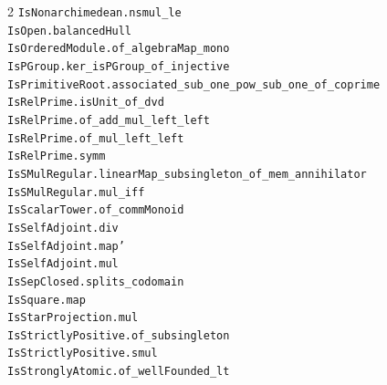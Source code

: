 \documentclass[10pt,a4paper]{article}
\begin{document}
\begin{multicols}{2}
\texttt{IsNonarchimedean.\allowbreak{}nsmul\_le} \\
\texttt{IsOpen.\allowbreak{}balancedHull} \\
\texttt{IsOrderedModule.\allowbreak{}of\_algebraMap\_mono} \\
\texttt{IsPGroup.\allowbreak{}ker\_isPGroup\_of\_injective} \\
\texttt{IsPrimitiveRoot.\allowbreak{}associated\_sub\_one\_pow\_sub\_one\_of\_coprime} \\
\texttt{IsRelPrime.\allowbreak{}isUnit\_of\_dvd} \\
\texttt{IsRelPrime.\allowbreak{}of\_add\_mul\_left\_left} \\
\texttt{IsRelPrime.\allowbreak{}of\_mul\_left\_left} \\
\texttt{IsRelPrime.\allowbreak{}symm} \\
\texttt{IsSMulRegular.\allowbreak{}linearMap\_subsingleton\_of\_mem\_annihilator} \\
\texttt{IsSMulRegular.\allowbreak{}mul\_iff} \\
\texttt{IsScalarTower.\allowbreak{}of\_commMonoid} \\
\texttt{IsSelfAdjoint.\allowbreak{}div} \\
\texttt{IsSelfAdjoint.\allowbreak{}map'} \\
\texttt{IsSelfAdjoint.\allowbreak{}mul} \\
\texttt{IsSepClosed.\allowbreak{}splits\_codomain} \\
\texttt{IsSquare.\allowbreak{}map} \\
\texttt{IsStarProjection.\allowbreak{}mul} \\
\texttt{IsStrictlyPositive.\allowbreak{}of\_subsingleton} \\
\texttt{IsStrictlyPositive.\allowbreak{}smul} \\
\texttt{IsStronglyAtomic.\allowbreak{}of\_wellFounded\_lt} \\

\end{multicols}
\end{document}
